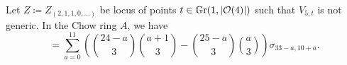 
\begin{proposition}
	Let $Z \coloneqq Z_{(2,1,1,0,\dotsc)}$ be locus of points $t\in \mathbb G \mathrm r(1,\lvert\mathcal{O}(4)\rvert)$ such that $V_{5,t}$ is not generic. In the Chow ring $A$, we have
	\begin{equation}
		[Z] = \sum_{a=0}^{11} \left({\binom{24-a}{3}}{\binom{a+1}{3}}-{\binom{25-a}{3}}{\binom{a}{3}}\right) \sigma_{33-a,10+a}. \label{class-of-locus}
	\end{equation}
\end{proposition}

